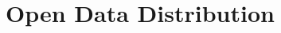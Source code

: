 


\section{Open Data Distribution}
\begin{comment}
import pint
reg = pint.UnitRegistry()
reg.define('CO2 = []')
reg.define('dollar = []')
kwh = reg.Unit('kilowatt/hour')
energy_cost = 0.16 * reg.dollar / (kwh)
emission_cost = 25 * reg.dollar / (1000 * reg.CO2 * reg.metric_ton)
energy = 1321.99 * kwh
emission = 277.612 * reg.CO2 * reg.kg
train = (energy * energy_cost + emission * emission_cost)

energy = 109.63 * kwh
emission = 23 * reg.CO2 * reg.kg
eval = (energy * energy_cost + emission * emission_cost)

train + eval
\end{comment}
  



\label{sec:distribution}

  


